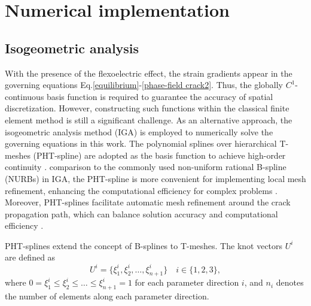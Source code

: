 \section{Numerical implementation}\label{Section3}
\subsection{Isogeometric analysis}
With the presence of the flexoelectric effect, the strain gradients appear in the governing equations Eq.\eqref{equilibrium}-\eqref{phase-field crack2}. Thus, the globally $C^1$-continuous basis function is required to guarantee the accuracy of spatial discretization. However, constructing such functions within the classical finite element method is still a significant challenge. As an alternative approach, the isogeometric analysis method (IGA) is employed to numerically solve the governing equations in this work. The polynomial splines over hierarchical T-meshes (PHT-spline) are adopted as the basis function to achieve high-order continuity \cite{deng_polynomial_2008}. comparison to the commonly used non-uniform rational B-spline (NURBs) in IGA, the PHT-spline is more convenient for implementing local mesh refinement, enhancing the computational efficiency for complex problems \cite{anitescu_recovery-based_2018}. Moreover, PHT-splines facilitate automatic mesh refinement around the crack propagation path, which can balance solution accuracy and computational efficiency \cite{goswami_adaptive_2020}.

PHT-splines extend the concept of B-splines to T-meshes. The knot vectors $U^i$ are defined as 
\begin{equation}
    U^i=\{\xi_1^i, \xi_2^i, \ldots, \xi_{n+1}^i\} \quad i\in\{1,2,3\},
\end{equation}
where $0=\xi_1^i\leq\xi_2^i\leq \ldots \leq\xi_{n+1}^i=1$ for each parameter direction $i$, and $n_i$ denotes the number of elements along each parameter direction.

